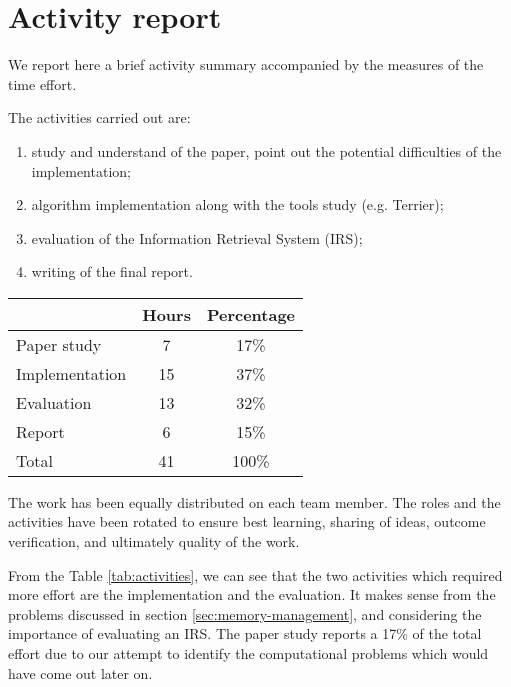 \section{Activity report}
We report here a brief activity summary accompanied by the measures of the time effort.

The activities carried out are:

\begin{enumerate}
    \item study and understand of the paper, point out the potential difficulties of the implementation;
    \item algorithm implementation along with the tools study (e.g. Terrier);
    \item evaluation of the Information Retrieval System (IRS);
    \item writing of the final report.
\end{enumerate}

\begin{center}
   \begin{tabular}{| l | c | c |}
    \hline
    & Hours & Percentage\\ \hline
    Paper study & 7 & 17\%\\ \hline
    Implementation & 15 & 37\%\\ \hline
    Evaluation & 13 & 32\%\\ \hline
    Report & 6 & 15\%\\ \hline
    Total & 41 & 100\%\\ \hline
    \end{tabular}
    \label{tab:activities}
\end{center}

The work has been equally distributed on each team member. The roles and the activities have been rotated to ensure best learning, sharing of ideas, outcome verification, and ultimately quality of the work.

From the Table \ref{tab:activities}, we can see that the two activities which required more effort are the implementation and the evaluation. It makes sense from the problems discussed in section \ref{sec:memory-management}, and considering the importance of evaluating an IRS. The paper study reports a 17\% of the total effort due to our attempt to identify the computational problems which would have come out later on.